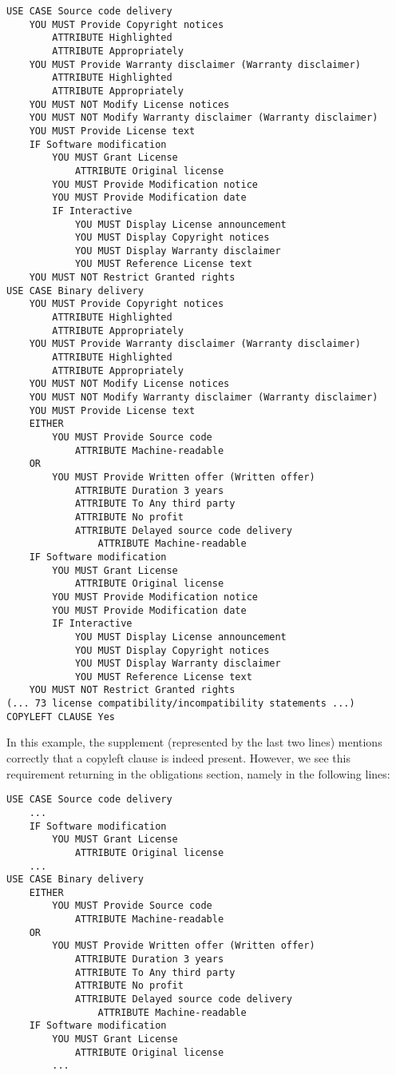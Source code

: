 \begin{verbatim}
USE CASE Source code delivery
    YOU MUST Provide Copyright notices
        ATTRIBUTE Highlighted
        ATTRIBUTE Appropriately
    YOU MUST Provide Warranty disclaimer (Warranty disclaimer)
        ATTRIBUTE Highlighted
        ATTRIBUTE Appropriately
    YOU MUST NOT Modify License notices
    YOU MUST NOT Modify Warranty disclaimer (Warranty disclaimer)
    YOU MUST Provide License text
    IF Software modification
        YOU MUST Grant License
            ATTRIBUTE Original license
        YOU MUST Provide Modification notice
        YOU MUST Provide Modification date
        IF Interactive
            YOU MUST Display License announcement
            YOU MUST Display Copyright notices
            YOU MUST Display Warranty disclaimer
            YOU MUST Reference License text
    YOU MUST NOT Restrict Granted rights
USE CASE Binary delivery
    YOU MUST Provide Copyright notices
        ATTRIBUTE Highlighted
        ATTRIBUTE Appropriately
    YOU MUST Provide Warranty disclaimer (Warranty disclaimer)
        ATTRIBUTE Highlighted
        ATTRIBUTE Appropriately
    YOU MUST NOT Modify License notices
    YOU MUST NOT Modify Warranty disclaimer (Warranty disclaimer)
    YOU MUST Provide License text
    EITHER
        YOU MUST Provide Source code
            ATTRIBUTE Machine-readable
    OR
        YOU MUST Provide Written offer (Written offer)
            ATTRIBUTE Duration 3 years
            ATTRIBUTE To Any third party
            ATTRIBUTE No profit
            ATTRIBUTE Delayed source code delivery
                ATTRIBUTE Machine-readable
    IF Software modification
        YOU MUST Grant License
            ATTRIBUTE Original license
        YOU MUST Provide Modification notice
        YOU MUST Provide Modification date
        IF Interactive
            YOU MUST Display License announcement
            YOU MUST Display Copyright notices
            YOU MUST Display Warranty disclaimer
            YOU MUST Reference License text
    YOU MUST NOT Restrict Granted rights
(... 73 license compatibility/incompatibility statements ...)
COPYLEFT CLAUSE Yes
\end{verbatim}

In this example, the supplement (represented by the last two lines) mentions correctly that a copyleft clause is indeed present. However, we see this requirement returning in the obligations section, namely in the following lines:

\begin{verbatim}
USE CASE Source code delivery
    ...
    IF Software modification
        YOU MUST Grant License
            ATTRIBUTE Original license
    ...
USE CASE Binary delivery
    EITHER
        YOU MUST Provide Source code
            ATTRIBUTE Machine-readable
    OR
        YOU MUST Provide Written offer (Written offer)
            ATTRIBUTE Duration 3 years
            ATTRIBUTE To Any third party
            ATTRIBUTE No profit
            ATTRIBUTE Delayed source code delivery
                ATTRIBUTE Machine-readable
    IF Software modification
        YOU MUST Grant License
            ATTRIBUTE Original license
        ...
\end{verbatim}

